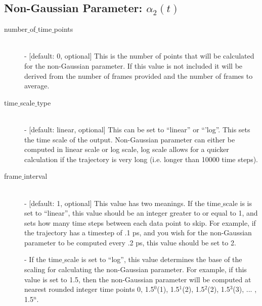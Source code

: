 \documentclass{article}
\begin{document}
\subsection{Non-Gaussian Parameter: $\alpha_2(t)$} \label{sec::alpha2_parm}
\begin{description}	
	\item[number$\_$of$\_$time$\_$points]\hfill \\
	- [default: 0, optional] This is the number of points that will be calculated for the non-Gaussian parameter.  If this value is not included it will be derived from the number of frames provided and the number of frames to average.
	
	\item[time$\_$scale$\_$type] \hfill \\
	- [default: linear, optional] This can be set to ``linear'' or ``'log''.  This sets the time scale of the output. Non-Gaussian parameter can either be computed in linear scale or log scale, log scale allows for a quicker calculation if the trajectory is very long (i.e. longer than 10000 time steps).
	
	\item[frame$\_$interval] \hfill \\
	- [default: 1, optional] This value has two meanings.  If the time$\_$scale is is set to ``linear'', this value should be an integer greater to or equal to 1, and sets how many time steps between each data point to skip.  For example, if the trajectory has a timestep of .1 ps, and you wish for the non-Gaussian parameter to be computed every .2 ps, this value should be set to 2. 
	
	- If the time$\_$scale is set to ``log'', this value determines the base of the scaling for calculating the non-Gaussian parameter.   For example, if this value is set to 1.5, then the non-Gaussian parameter will be computed at nearest rounded integer time points 0, 1.5$^0$(1), 1.5$^1$(2), 1.5$^2$(2), 1.5$^3$(3), ... , 1.5$^{n}$.
	
\end{description}
\end{document}
